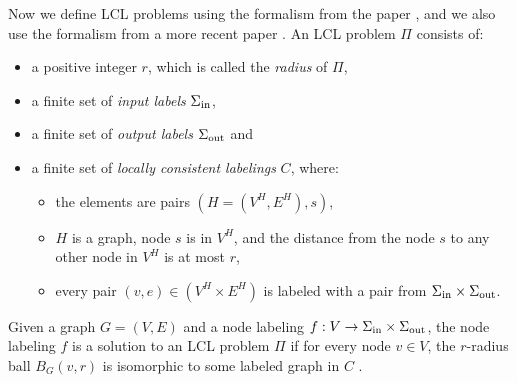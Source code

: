 Now we define LCL problems using the formalism from the paper \cite{DBLP:journals/siamcomp/NaorS95}, and we also use the formalism from a more recent paper \cite{DBLP:journals/corr/abs-2105-05574}.
An LCL problem $\Pi$ consists of:
\begin{itemize}
  \item a positive integer $r$, which is called the \emph{radius} of $\Pi$,
  \item a finite set of \emph{input labels} $\Sigma_{\text{in}}$,
  \item a finite set of \emph{output labels} $\Sigma_{\text{out}}$ and
  \item a finite set of \emph{locally consistent labelings} $C$, where:
  \begin{itemize}
    \item the elements are pairs $(H=(V^H, E^H), s)$,
    \item $H$ is a graph, node $s$ is in $V^H$, and the distance from the node $s$ to any other node in $V^H$ is at most $r$,
    \item every pair $(v, e) \in (V^H \times E^H)$ is labeled with a pair from $\Sigma_{\text{in}} \times \Sigma_{\text{out}}$.
  \end{itemize}
\end{itemize}
Given a graph $G = (V, E)$ and a node labeling $f: V \rightarrow \Sigma_{\text{in}} \times \Sigma_{\text{out}}$, the node labeling $f$ is a solution to an LCL problem $\Pi$ if for every node $v \in V$, the $r$-radius ball $B_G(v, r)$ is isomorphic to some labeled graph in $C$ \cite{DBLP:journals/corr/abs-2105-05574}.

